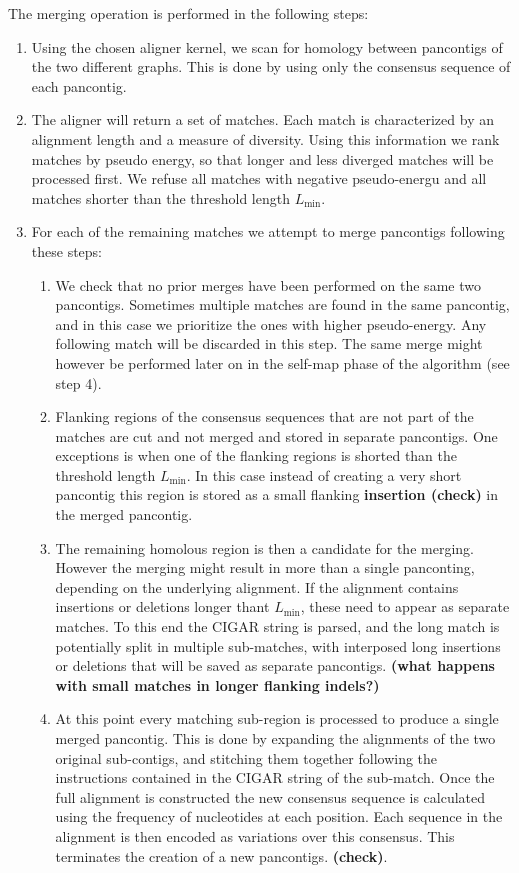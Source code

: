 \documentclass[aps,rmp,reprint,superscriptaddress,notitlepage,10pt,onecolumn]{revtex4-1}
\newcommand{\Lthr}{L_{\min}}
\begin{document}
The merging operation is performed in the following steps:
\begin{enumerate}
    \item Using the chosen aligner kernel, we scan for homology between pancontigs of the two different graphs. This is done by using only the consensus sequence of each pancontig.
    \item The aligner will return a set of matches. Each match is characterized by an alignment length and a measure of diversity. Using this information we rank matches by pseudo energy, so that longer and less diverged matches will be processed first. We refuse all matches with negative pseudo-energu and all matches shorter than the threshold length $\Lthr$.
    \item For each of the remaining matches we attempt to merge pancontigs following these steps:
          \begin{enumerate}
              \item We check that no prior merges have been performed on the same two pancontigs. Sometimes multiple matches are found in the same pancontig, and in this case we prioritize the ones with higher pseudo-energy. Any following match will be discarded in this step. The same merge might however be performed later on in the self-map phase of the algorithm (see step 4).
              \item Flanking regions of the consensus sequences that are not part of the matches are cut and not merged and stored in separate pancontigs. One exceptions is when one of the flanking regions is shorted than the threshold length $\Lthr$. In this case instead of creating a very short pancontig this region is stored as a small flanking \textbf{insertion (check)} in the merged pancontig.
              \item The remaining homolous region is then a candidate for the merging. However the merging might result in more than a single panconting, depending on the underlying alignment. If the alignment contains insertions or deletions longer thant $\Lthr$, these need to appear as separate matches. To this end the CIGAR string is parsed, and the long match is potentially split in multiple sub-matches, with interposed long insertions or deletions that will be saved as separate pancontigs. \textbf{(what happens with small matches in longer flanking indels?)}
              \item At this point every matching sub-region is processed to produce a single merged pancontig. This is done by expanding the alignments of the two original sub-contigs, and stitching them together following the instructions contained in the CIGAR string of the sub-match. Once the full alignment is constructed the new consensus sequence is calculated using the frequency of nucleotides at each position. Each sequence in the alignment is then encoded as variations over this consensus. This terminates the creation of a new pancontigs. \textbf{(check)}.

\end{enumerate}
\end{enumerate}
\end{document}
